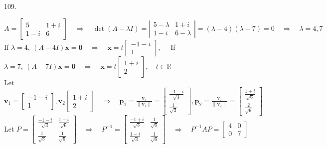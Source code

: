 \documentclass[12pt]{book}
\begin{document}
\begin{CJK}{UTF8}{bsmi}
109. \begin{minipage}[t]{\dimexpr\linewidth-2em}
$A=\begin{bmatrix}
5 & 1+i \\
1-i & 6
\end{bmatrix}\quad\Rightarrow\quad\det(A-\lambda I)=\left|\begin{matrix}
5-\lambda & 1+i \\
1-i & 6-\lambda
\end{matrix}\right|=(\lambda-4)(\lambda-7)=0\quad\Rightarrow\quad\lambda=4, 7$ \\
If $\lambda=4,\ (A-4 I)\textbf{x}=\textbf{0}\quad\Rightarrow\quad\textbf{x}=t\begin{bmatrix}
-1-i \\ 1
\end{bmatrix},\quad$ If $\lambda=7,\ (A-7 I)\textbf{x}=\textbf{0}\quad\Rightarrow\quad\textbf{x}=t\begin{bmatrix}
1+i \\ 2
\end{bmatrix},\quad t\in\mathbb{R}$ \\
Let $\displaystyle\textbf{v}_1=\begin{bmatrix}
-1-i \\ 1
\end{bmatrix},\textbf{v}_2\begin{bmatrix}
1+i \\ 2
\end{bmatrix}\quad\Rightarrow\quad\textbf{p}_1=\frac{\textbf{v}_1}{\parallel\textbf{v}_1\parallel}=\begin{bmatrix}
\frac{-1-i}{\sqrt{3}} \\ \frac{1}{\sqrt{3}}
\end{bmatrix},\textbf{p}_2=\frac{\textbf{v}_2}{\parallel\textbf{v}_2\parallel}=\begin{bmatrix}
\frac{1+i}{\sqrt{6}} \\ \frac{2}{\sqrt{6}}
\end{bmatrix}$ \\
Let $\displaystyle P=\begin{bmatrix}
\frac{-1-i}{\sqrt{3}} & \frac{1+i}{\sqrt{6}} \\
\frac{1}{\sqrt{3}} & \frac{1}{\sqrt{6}}
\end{bmatrix}\quad\Rightarrow\quad P^{-1}=\begin{bmatrix}
\frac{-1+i}{\sqrt{3}} & \frac{1}{\sqrt{6}} \\
\frac{1-i}{\sqrt{3}} & \frac{1}{\sqrt{6}}
\end{bmatrix}\quad\Rightarrow\quad P^{-1}AP=\begin{bmatrix}
4 & 0 \\
0 & 7
\end{bmatrix}$
\end{minipage}\\


\end{CJK}
\end{document}
